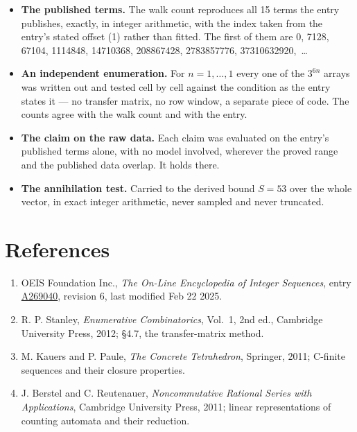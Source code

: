 \documentclass[11pt]{article}
\theoremstyle{definition}
\begin{document}
\begin{itemize}

\item {\bfseries The published terms.} The walk count reproduces all 15 terms the entry publishes, exactly, in integer arithmetic, with the index taken from the entry's stated offset (1) rather than fitted. The first of them are 0, 7128, 67104, 1114848, 14710368, 208867428, 2783857776, 37310632920,~\dots

\item {\bfseries An independent enumeration.} For $n = 1,\dots,1$ every one of the $3^{6n}$ arrays was written out and tested cell by cell against the condition as the entry states it --- no transfer matrix, no row window, a separate piece of code. The counts agree with the walk count and with the entry.

\item {\bfseries The claim on the raw data.} Each claim was evaluated on the entry's published terms alone, with no model involved, wherever the proved range and the published data overlap. It holds there.

\item {\bfseries The annihilation test.} Carried to the derived bound $S = 53$ over the whole vector, in exact integer arithmetic, never sampled and never truncated.

\end{itemize}

\section{References}

\begin{enumerate}

\item OEIS Foundation Inc., \emph{The On-Line Encyclopedia of Integer Sequences}, entry \href{https://oeis.org/A269040}{A269040}, revision 6, last modified Feb 22 2025.

\item R. P. Stanley, \emph{Enumerative Combinatorics}, Vol.~1, 2nd ed., Cambridge University Press, 2012; \S4.7, the transfer-matrix method.

\item M. Kauers and P. Paule, \emph{The Concrete Tetrahedron}, Springer, 2011; C-finite sequences and their closure properties.

\item J. Berstel and C. Reutenauer, \emph{Noncommutative Rational Series with Applications}, Cambridge University Press, 2011; linear representations of counting automata and their reduction.

\end{enumerate}
\end{document}
